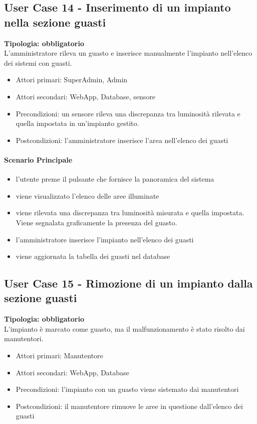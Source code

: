 \documentclass[12pt]{article}
\begin{document}
\subsection{User Case 14 - Inserimento di un impianto nella sezione guasti}
\textbf{Tipologia: obbligatorio} \\
L'amministratore rileva un guasto e inserisce manualmente l'impianto nell'elenco dei sistemi con guasti.
\begin{itemize}
	\item Attori primari: SuperAdmin, Admin
	\item Attori secondari: WebApp, Database, sensore
	\item Precondizioni: un sensore rileva una discrepanza tra luminosità rilevata e quella impostata in un'impianto gestito.
	\item Postcondizioni: l'amministratore inserisce l'area nell'elenco dei guasti
\end{itemize}
\paragraph{Scenario Principale}
\begin{itemize}
	\item l'utente preme il pulsante che fornisce la panoramica del sistema
	\item viene visualizzato l'elenco delle aree illuminate
	\item viene rilevata una discrepanza tra luminosità misurata e quella impostata. Viene segnalata graficamente la presenza del guasto.
	\item l'amministratore inserisce l'impianto nell'elenco dei guasti
	\item viene aggiornata la tabella dei guasti nel database
\end{itemize}

\subsection{User Case 15 - Rimozione di un impianto dalla sezione guasti}
\textbf{Tipologia: obbligatorio} \\
L'impianto è marcato come guasto, ma il malfunzionamento è stato risolto dai manutentori.
\begin{itemize}
	\item Attori primari: Manutentore
	\item Attori secondari: WebApp, Database
	\item Precondizioni: l'impianto con un guasto viene sistemato dai manutentori
	\item Postcondizioni: il manutentore rimuove le aree in questione dall'elenco dei guasti
\end{itemize}
\end{document}
